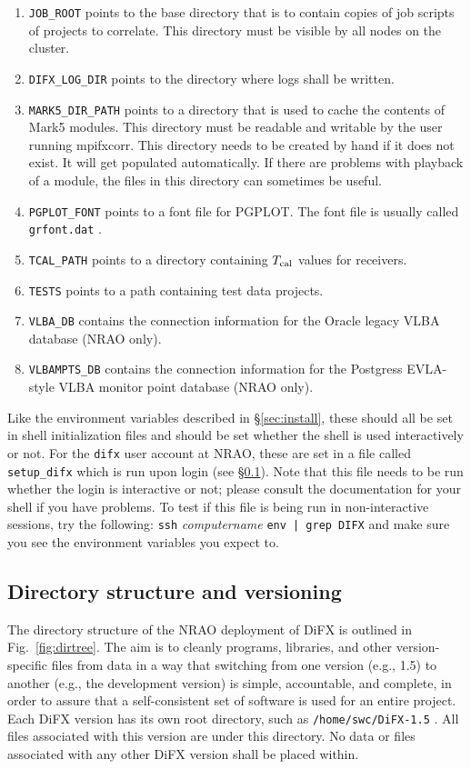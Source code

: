 \begin{enumerate}
\item {\tt JOB\_ROOT} points to the base directory that is to contain copies of job scripts of projects to correlate.
This directory must be visible by all nodes on the cluster.
\item {\tt DIFX\_LOG\_DIR} points to the directory where logs shall be written.
\item {\tt MARK5\_DIR\_PATH} points to a directory that is used to cache the contents of Mark5 modules.
This directory must be readable and writable by the user running mpifxcorr.
This directory needs to be created by hand if it does not exist.  
It will get populated automatically.
If there are problems with playback of a module, the files in this directory can sometimes be useful.
\item {\tt PGPLOT\_FONT} points to a font file for PGPLOT.
The font file is usually called {\tt grfont.dat} .
\item {\tt TCAL\_PATH} points to a directory containing $T_{\rm cal}$ values for receivers.
\item {\tt TESTS} points to a path containing test data projects.
\item {\tt VLBA\_DB} contains the connection information for the Oracle legacy VLBA database (NRAO only).
\item {\tt VLBAMPTS\_DB} contains the connection information for the Postgress EVLA-style VLBA monitor point database (NRAO only).
\end{enumerate}
Like the environment variables described in \S\ref{sec:install}, these should all be set in shell initialization files and should be set whether the shell is used interactively or not.
For the {\tt difx} user account at NRAO, these are set in a file called {\tt setup\_difx} which is run upon login (see \S\ref{sec:versions}).
Note that this file needs to be run whether the login is interactive or not; please consult the documentation for your shell if you have problems.
To test if this file is being run in non-interactive sessions, try the following: {\tt ssh} {\em computername} {\tt env | grep DIFX} and make sure you see the environment variables you expect to.


\subsection{Directory structure and versioning} \label{sec:versions}

The directory structure of the NRAO deployment of DiFX is outlined in Fig.~\ref{fig:dirtree}.
The aim is to cleanly programs, libraries, and other version-specific files from data in a way that switching from one version (e.g., 1.5) to another (e.g., the development version) is simple, accountable, and complete, in order to assure that a self-consistent set of software is used for an entire project.
Each DiFX version has its own root directory, such as {\tt /home/swc/DiFX-1.5} .
All files associated with this version are under this directory.
No data or files associated with any other DiFX version shall be placed within.

